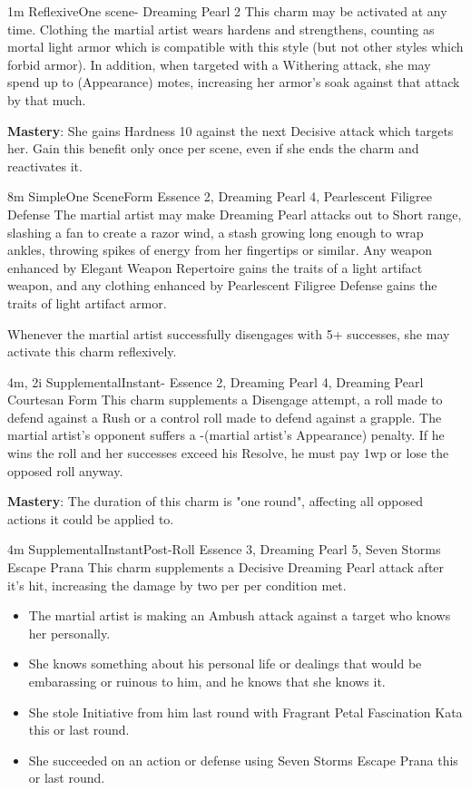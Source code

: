
{1m}
{Reflexive}{One scene}{-}
{Dreaming Pearl 2}
This charm may be activated at any time. Clothing the martial artist wears hardens and strengthens, counting as mortal light armor which is compatible with this style (but not other styles which forbid armor). In addition, when targeted with a Withering attack, she may spend up to (Appearance) motes, increasing her armor's soak against that attack by that much.

\textbf{Mastery}: She gains Hardness 10 against the next Decisive attack which targets her. Gain this benefit only once per scene, even if she ends the charm and reactivates it.

{8m}
{Simple}{One Scene}{Form}
{Essence 2, Dreaming Pearl 4, Pearlescent Filigree Defense}
The martial artist may make Dreaming Pearl attacks out to Short range, slashing a fan to create a razor wind, a stash growing long enough to wrap ankles, throwing spikes of energy from her fingertips or similar. Any weapon enhanced by Elegant Weapon Repertoire gains the traits of a light artifact weapon, and any clothing enhanced by Pearlescent Filigree Defense gains the traits of light artifact armor.

Whenever the martial artist successfully disengages with 5+ successes, she may activate this charm reflexively.

{4m, 2i}
{Supplemental}{Instant}{-}
{Essence 2, Dreaming Pearl 4, Dreaming Pearl Courtesan Form}
This charm supplements a Disengage attempt, a roll made to defend against a Rush or a control roll made to defend against a grapple. The martial artist's opponent suffers a -(martial artist's Appearance) penalty. If he wins the roll and her successes exceed his Resolve, he must pay 1wp or lose the opposed roll anyway.

\textbf{Mastery}: The duration of this charm is "one round", affecting all opposed actions it could be applied to.

{4m}
{Supplemental}{Instant}{Post-Roll}
{Essence 3, Dreaming Pearl 5, Seven Storms Escape Prana}
This charm supplements a Decisive Dreaming Pearl attack after it's hit, increasing the damage by two per per condition met.

\begin{itemize}
  \item The martial artist is making an Ambush attack against a target who knows her personally.
  \item She knows something about his personal life or dealings that would be embarassing or ruinous to him, and he knows that she knows it.
  \item She stole Initiative from him last round with Fragrant Petal Fascination Kata this or last round.
  \item She succeeded on an action or defense using Seven Storms Escape Prana this or last round.
\end{itemize}


